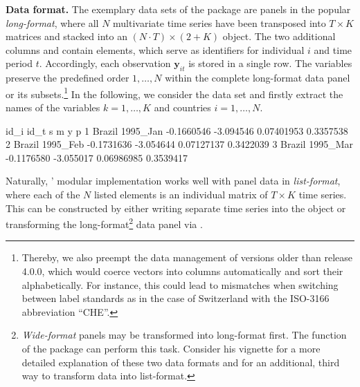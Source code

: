 \textbf{Data format.} The exemplary data sets of the  package are panels in the popular \textit{long-format}, where all $ N $ multivariate time series have been transposed into $ T \times K $ matrices and stacked into an $ (N \cdot T) \times (2 + K)  $  object. The two additional columns  and  contain  elements, which serve as identifiers for individual $ i $ and time period $ t $. Accordingly, each observation $ \boldsymbol{y}_{it} $ is stored in a single row. The  variables preserve the predefined  order $ 1,\ldots,N $ within the complete long-format data panel or its subsets.\footnote{Thereby, we also preempt the data management of  versions older than release 4.0.0, which would coerce  vectors into  columns automatically and sort their  alphabetically. For instance, this could lead to mismatches when switching between label standards as in the case of Switzerland with the ISO-3166 abbreviation ``CHE''.} In the following, we consider the data set  and firstly extract the names of the variables $ k = 1, \ldots, K $ and countries $ i = 1, \ldots, N $.
\begin{CodeChunk}
\begin{CodeOutput}
    id_i     id_t          s         m          y         p
1 Brazil 1995_Jan -0.1660546 -3.094546 0.07401953 0.3357538
2 Brazil 1995_Feb -0.1731636 -3.054644 0.07127137 0.3422039
3 Brazil 1995_Mar -0.1176580 -3.055017 0.06986985 0.3539417
\end{CodeOutput}
\end{CodeChunk}
Naturally, ' modular implementation works well with panel data in \textit{list-format}, where each of the $ N $ listed elements is an individual matrix of $ T \times K $ time series. This can be constructed by either writing separate time series into the  object or transforming the long-format\footnote{\textit{Wide-format} panels may be transformed into long-format first. The function  of the  package \citep{Hadley2007} can perform this task. Consider his vignette for a more detailed explanation of these two data formats and for an additional, third way to transform data into list-format.} data panel via  .
